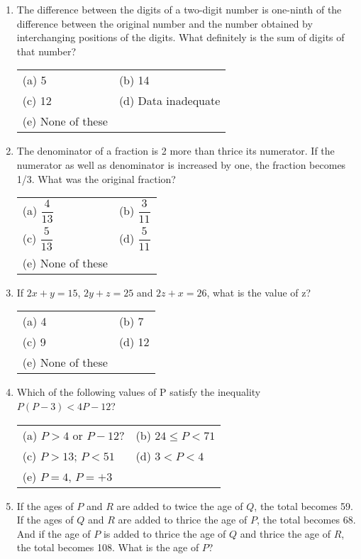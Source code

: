 \begin{multicols}{2}
\begin{enumerate}[leftmargin=*]
\item The difference between the digits of a two-digit number is one-ninth of the difference between the original number and the number obtained by interchanging positions of the digits. What definitely is the sum of digits of that number?

\begin{tabular}{l@{\qquad\quad}l}
(a) 5 & (b) 14 \\
(c) 12 & (d) Data inadequate\\
(e) None of these
\end{tabular}

\item The denominator of a fraction is 2 more than thrice its numerator. If the numerator as well as denominator is increased by one, the fraction becomes 1/3. What was the original fraction?

\begin{tabular}{l@{\qquad\quad}l}
(a) $\dfrac{4}{13}$ & (b) $\dfrac{3}{11}$\\[0.3cm]
(c) $\dfrac{5}{13}$ & (d) $\dfrac{5}{11}$\\
(e) None of these
\end{tabular}

\item If $2x + y = 15$, $2y + z = 25$ and $2z + x = 26$, what is the value of z?

\begin{tabular}{l@{\qquad\quad}l}
(a) 4 & (b) 7 \\
(c) 9 & (d) 12 \\
(e) None of these
\end{tabular}

\item Which of the following values of P satisfy the inequality $P(P - 3) < 4P - 12$?
  
\begin{tabular}{l@{\qquad\quad}l}
(a)  $P > 4$ or $P - 12$? & (b) $24 \leq P < 71$ \\
(c)  $P > 13$; $P < 51$ & (d) $3 < P < 4$ \\
(e) $P = 4$, $P = +3$
\end{tabular}

\item If the ages of $P$ and $R$ are added to twice the age of $Q$, the total becomes 59. If the ages of $Q$ and $R$ are added to thrice the age of $P$, the total becomes 68. And if the age of $P$ is added to thrice the age of $Q$ and thrice the age of $R$, the total becomes 108. What is the age of $P$?


\end{enumerate}
\end{multicols}
